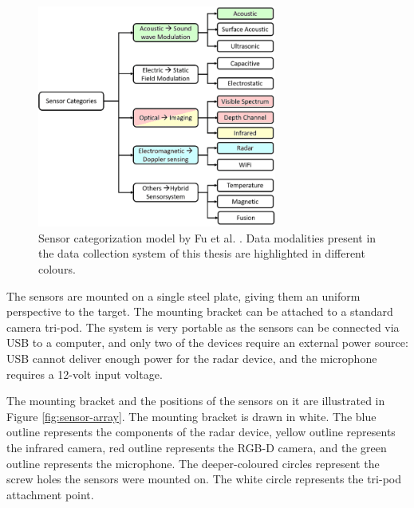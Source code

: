 \begin{figure}[H]
    \centering
    \includegraphics[width=0.7\textwidth]{fig/2/sensor-categories.png}
    \caption{
        Sensor categorization model by Fu et al. \cite{sensing-survey}.
        Data modalities present in the data collection system of this thesis are highlighted in different colours.
    }
    \label{fig:sensor-categories}
\end{figure}

The sensors are mounted on a single steel plate,
giving them an uniform perspective to the target.
The mounting bracket can be attached to a standard camera tri-pod.
The system is very portable as the sensors can be connected via USB to a computer,
and only two of the devices require an external power source:
USB cannot deliver enough power for the radar device, and the microphone requires a 12-volt input voltage.

The mounting bracket and the positions of the sensors on it are illustrated in Figure \ref{fig:sensor-array}.
The mounting bracket is drawn in white.
The blue outline represents the components of the radar device,
yellow outline represents the infrared camera,
red outline represents the RGB-D camera,
and the green outline represents the microphone.
The deeper-coloured circles represent the screw holes the sensors were mounted on.
The white circle represents the tri-pod attachment point.

